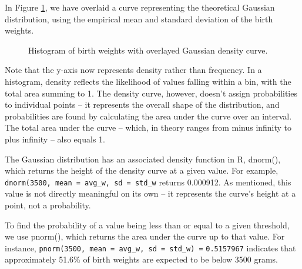 \documentclass[
]{book}
\makeatletter
\newenvironment{Shaded}{\begin{snugshade}}{\end{snugshade}}
\newcommand{\AttributeTok}[1]{\textcolor[rgb]{0.13,0.29,0.53}{#1}}
\newcommand{\ConstantTok}[1]{\textcolor[rgb]{0.56,0.35,0.01}{#1}}
\newcommand{\DecValTok}[1]{\textcolor[rgb]{0.00,0.00,0.81}{#1}}
\newcommand{\FunctionTok}[1]{\textcolor[rgb]{0.13,0.29,0.53}{\textbf{#1}}}
\newcommand{\NormalTok}[1]{#1}
\newcommand{\OtherTok}[1]{\textcolor[rgb]{0.56,0.35,0.01}{#1}}
\newcommand{\SpecialCharTok}[1]{\textcolor[rgb]{0.81,0.36,0.00}{\textbf{#1}}}
\newcommand*\pandocbounded[1]{%
  \sbox\pandoc@box{#1}%
  \Gscale@div\@tempa{\textheight}{\dimexpr\ht\pandoc@box+\dp\pandoc@box\relax}%
  \Gscale@div\@tempb{\linewidth}{\wd\pandoc@box}%
  \ifdim\@tempb\p@<\@tempa\p@\let\@tempa\@tempb\fi%
  \ifdim\@tempa\p@<\p@\scalebox{\@tempa}{\usebox\pandoc@box}%
  \else\usebox{\pandoc@box}%
  \fi%
}
\makeatother
\begin{document}
In Figure \ref{fig:stat-hist4}, we have overlaid a curve representing the theoretical Gaussian distribution, using the empirical mean and standard deviation of the birth weights.

\begin{Shaded}
\end{Shaded}

\begin{figure}
\centering
\pandocbounded{}
\caption{\label{fig:stat-hist4}Histogram of birth weights with overlayed Gaussian density curve.}
\end{figure}

Note that the y-axis now represents density rather than frequency. In a histogram, density reflects the likelihood of values falling within a bin, with the total area summing to 1. The density curve, however, doesn't assign probabilities to individual points -- it represents the overall shape of the distribution, and probabilities are found by calculating the area under the curve over an interval. The total area under the curve -- which, in theory ranges from minus infinity to plus infinity -- also equals 1.

The Gaussian distribution has an associated density function in R, dnorm(), which returns the height of the density curve at a given value. For example, \texttt{dnorm(3500,\ mean\ =\ avg\_w,\ sd\ =\ std\_w} returns 0.000912. As mentioned, this value is not directly meaningful on its own -- it represents the curve's height at a point, not a probability.

To find the probability of a value being less than or equal to a given threshold, we use pnorm(), which returns the area under the curve up to that value. For instance, \texttt{pnorm(3500,\ mean\ =\ avg\_w,\ sd\ =\ std\_w)\ =} \texttt{0.5157967} indicates that approximately 51.6\% of birth weights are expected to be below 3500 grams.
\end{document}
